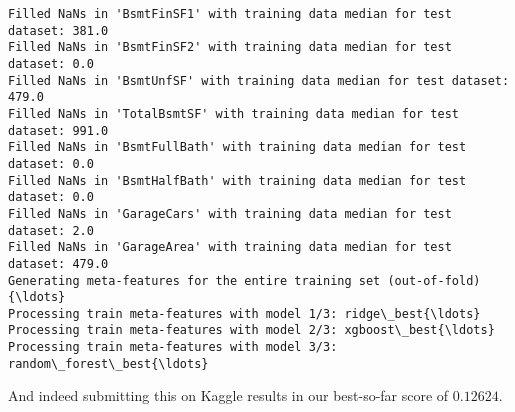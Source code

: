 \documentclass[11pt]{article}
\begin{document}
    \begin{Verbatim}[commandchars=\\\{\}]
Filled NaNs in 'BsmtFinSF1' with training data median for test dataset: 381.0
Filled NaNs in 'BsmtFinSF2' with training data median for test dataset: 0.0
Filled NaNs in 'BsmtUnfSF' with training data median for test dataset: 479.0
Filled NaNs in 'TotalBsmtSF' with training data median for test dataset: 991.0
Filled NaNs in 'BsmtFullBath' with training data median for test dataset: 0.0
Filled NaNs in 'BsmtHalfBath' with training data median for test dataset: 0.0
Filled NaNs in 'GarageCars' with training data median for test dataset: 2.0
Filled NaNs in 'GarageArea' with training data median for test dataset: 479.0
Generating meta-features for the entire training set (out-of-fold){\ldots}
Processing train meta-features with model 1/3: ridge\_best{\ldots}
Processing train meta-features with model 2/3: xgboost\_best{\ldots}
Processing train meta-features with model 3/3: random\_forest\_best{\ldots}
    \end{Verbatim}

    And indeed submitting this on Kaggle results in our best-so-far score of
\(0.12624\).


    
    
    
\end{document}
